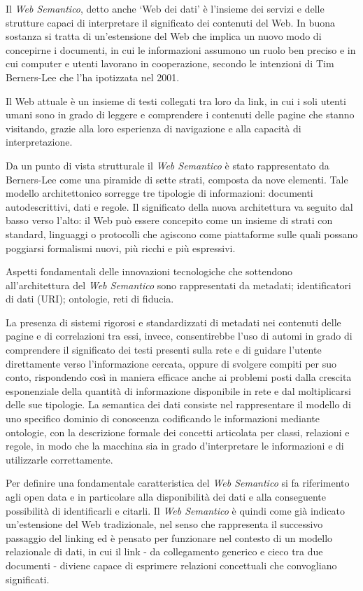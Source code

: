 {Il \emph{Web Semantico}, detto anche `Web dei dati' è l'insieme dei
servizi e delle strutture capaci di interpretare il significato dei
contenuti del Web. In buona sostanza si tratta di un'estensione del Web
che implica un nuovo modo di concepirne i documenti, in cui le
informazioni assumono un ruolo ben preciso e in cui computer e utenti
lavorano in cooperazione, secondo le intenzioni di Tim Berners-Lee che
l'ha ipotizzata nel 2001.

Il Web attuale è un insieme di testi collegati tra loro da link, in cui
i soli utenti umani sono in grado di leggere e comprendere i contenuti
delle pagine che stanno visitando, grazie alla loro esperienza di
navigazione e alla capacità di interpretazione.

Da un punto di vista strutturale il \emph{Web Semantico} è stato
rappresentato da Berners-Lee come una piramide di sette strati, composta
da nove elementi. Tale modello architettonico sorregge tre tipologie di
informazioni: documenti autodescrittivi, dati e regole. Il significato
della nuova architettura va seguito dal basso verso l'alto: il Web può
essere concepito come un insieme di strati con standard, linguaggi o
protocolli che agiscono come piattaforme sulle quali possano poggiarsi
formalismi nuovi, più ricchi e più espressivi.

Aspetti fondamentali delle innovazioni tecnologiche che sottendono
all'architettura del \emph{Web Semantico} sono rappresentati da
metadati; identificatori di dati (URI); ontologie, reti di fiducia.

La presenza di sistemi rigorosi e standardizzati di metadati nei
contenuti delle pagine e di correlazioni tra essi, invece, consentirebbe
l'uso di automi in grado di comprendere il significato dei testi
presenti sulla rete e di guidare l'utente direttamente verso
l'informazione cercata, oppure di svolgere compiti per suo conto,
rispondendo così in maniera efficace anche ai problemi posti dalla
crescita esponenziale della quantità di informazione disponibile in rete
e dal moltiplicarsi delle sue tipologie. La semantica dei dati consiste
nel rappresentare il modello di uno specifico dominio di conoscenza
codificando le informazioni mediante ontologie, con la descrizione
formale dei concetti articolata per classi, relazioni e regole, in modo
che la macchina sia in grado d'interpretare le informazioni e di
utilizzarle correttamente.

Per definire una fondamentale caratteristica del \emph{Web Semantico} si
fa riferimento agli open data e in particolare alla disponibilità dei
dati e alla conseguente possibilità di identificarli e citarli. Il
\emph{Web Semantico} è quindi come già indicato un'estensione del Web
tradizionale, nel senso che rappresenta il successivo passaggio del
linking ed è pensato per funzionare nel contesto di un modello
relazionale di dati, in cui il link - da collegamento generico e cieco
tra due documenti - diviene capace di esprimere relazioni concettuali
che convogliano significati.

}
